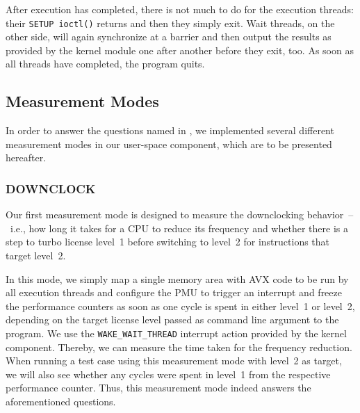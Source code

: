 After execution has completed, there is not much to do for the execution threads: their \texttt{SETUP ioctl()} returns and then they simply exit. Wait threads, on the other side, will again synchronize at a barrier and then output the results as provided by the kernel module one after another before they exit, too. As soon as all threads have completed, the program quits.

\subsection{Measurement Modes}
\label{sec:analysis:design:measurementmodes}

In order to answer the questions named in , we implemented several different measurement modes in our user-space component, which are to be presented hereafter.

\subsubsection{DOWNCLOCK}
\label{sec:analysis:design:measurementmodes:downclock}

Our first measurement mode is designed to measure the downclocking behavior~--~i.e., how long it takes for a \gls{CPU} to reduce its frequency and whether there is a step to turbo license level~1 before switching to level~2 for instructions that target level~2.

In this mode, we simply map a single memory area with \gls{AVX} code to be run by all execution threads and configure the \gls{PMU} to trigger an interrupt and freeze the performance counters as soon as one cycle is spent in either level~1 or level~2, depending on the target license level passed as command line argument to the program. We use the \texttt{WAKE\_WAIT\_THREAD} interrupt action provided by the kernel component. Thereby, we can measure the time taken for the frequency reduction. When running a test case using this measurement mode with level~2 as target, we will also see whether any cycles were spent in level~1 from the respective performance counter. Thus, this measurement mode indeed answers the aforementioned questions.

